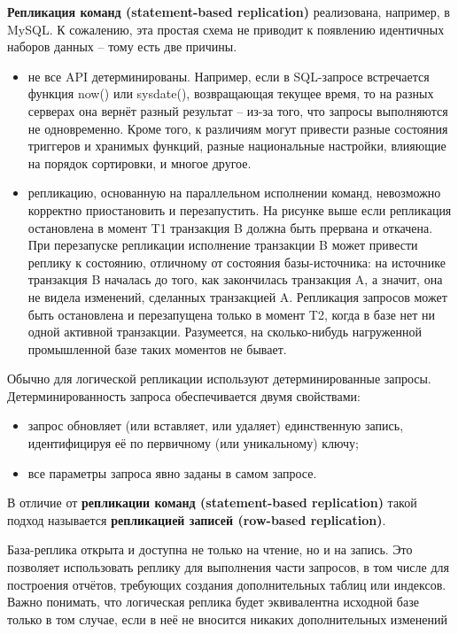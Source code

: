 \textbf{Репликация команд (statement-based replication)} реализована, например, в MySQL. К сожалению, эта простая схема не
приводит к появлению идентичных наборов данных – тому есть две причины.
\begin{itemize}
    \item не все API детерминированы. Например, если в SQL-запросе встречается функция now() или sysdate(), возвращающая текущее время, то на разных серверах она вернёт разный результат – из-за того, что запросы выполняются не одновременно. Кроме того, к различиям могут привести разные состояния триггеров и хранимых функций, разные национальные настройки, влияющие на порядок сортировки, и многое другое.
    \item репликацию, основанную на параллельном исполнении команд, невозможно корректно приостановить и перезапустить. На рисунке выше если репликация остановлена в момент T1 транзакция B должна быть прервана и откачена. При перезапуске репликации исполнение транзакции B может привести реплику к состоянию, отличному от состояния базы-источника: на источнике транзакция B началась до того, как закончилась транзакция A, а значит, она не видела изменений, сделанных транзакцией A. Репликация запросов может быть остановлена и перезапущена только в момент T2, когда в базе нет ни одной активной транзакции. Разумеется, на сколько-нибудь нагруженной промышленной базе таких моментов не бывает.
\end{itemize}

Обычно для логической репликации используют детерминированные запросы. Детерминированность запроса обеспечивается двумя
свойствами:
\begin{itemize}
    \item запрос обновляет (или вставляет, или удаляет) единственную запись, идентифицируя её по первичному (или уникальному) ключу;
    \item все параметры запроса явно заданы в самом запросе.
\end{itemize}

В отличие от \textbf{репликации команд (statement-based replication)} такой подход называется \textbf{репликацией
записей (row-based replication)}.

База-реплика открыта и доступна не только на чтение, но и на запись. Это позволяет использовать реплику для выполнения
части запросов, в том числе для построения отчётов, требующих создания дополнительных таблиц или индексов. Важно
понимать, что логическая реплика будет эквивалентна исходной базе только в том случае, если в неё не вносится никаких
дополнительных изменений

